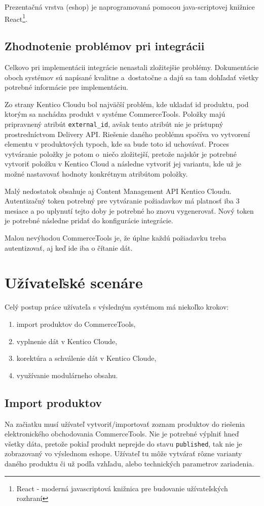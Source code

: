 \documentclass[
  printed, %
  table,   %
  lof,     %
  nolot,     %
  twoside,  
]{fithesis3}
\begin{document}
Prezentačná vrstva (eshop) je naprogramovaná pomocou java-scriptovej knižnice React\footnote{React - moderná javascriptová knižnica pre budovanie užívateľských rozhraní}.


\section{Zhodnotenie problémov pri integrácii}
Celkovo pri implementácii integrácie nenastali zložitejšie problémy. Dokumentácie oboch systémov sú napísané kvalitne a~dostatočne a dajú sa tam dohľadať všetky potrebné informácie pre implementáciu.

Zo strany Kentico Cloudu bol najväčší problém, kde ukladať id produktu, pod ktorým sa nachádza produkt v systéme CommerceTools. Položky majú pripravnený atribút \texttt{external\_id}, avšak tento atribút nie je prístupný prostredníctvom Delivery API. Riešenie daného problému spočíva vo vytvorení elementu v produktových typoch, kde sa bude toto id uchovávať. Proces vytváranie položky je potom o~niečo zložitejší, pretože najskôr je potrebné vytvoriť položku v Kentico Cloud a následne vytvoriť jej variantu, kde už je možné nastavovať hodnoty konkrétnym atribútom položky.

Malý nedostatok obsahuje aj Content Management API Kentico Cloudu. Autentizačný token potrebný pre vytváranie požiadavkov má platnosť iba 3 mesiace a po uplynutí tejto doby je potrebné ho znovu vygenerovať. Nový token je potrebné následne pridať do konfigurácie integrácie.

Malou nevýhodou CommerceTools je, že úplne každú požiadavku treba autentizovať, aj keď ide iba o čítanie dát.

\chapter{Užívateľské scenáre}
Celý postup práce užívateľa s výsledným systémom má niekoľko krokov:
\begin{enumerate}
	\item import produktov do CommerceTools,
	\item vyplnenie dát v Kentico Cloude,
	\item korektúra a schválenie dát v Kentico Cloude,
	\item využívanie modulárneho obsahu.
\end{enumerate}

\section{Import produktov}
Na začiatku musí užívateľ vytvoriť/importovať zoznam produktov do riešenia elektronického obchodovania CommerceTools. Nie je potrebné výplniť hneď všetky dáta, pretože pokiaľ produkt neprejde do stavu \texttt{published}, tak nie je zobrazovaný vo výslednom eshope. Užívateľ tu môže vytvárať rôzne varianty daného produktu či už podľa vzhľadu, alebo technických parametrov zariadenia.
\end{document}
